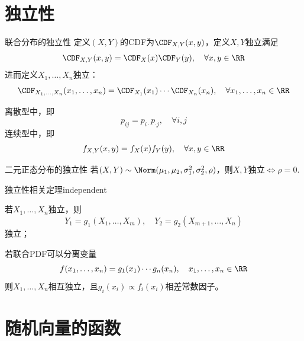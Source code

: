 \section{独立性}

\begin{definition}{联合分布的独立性}{}
	定义$(X,Y)$的CDF为$\CDF_{X,Y}(x,y)$，定义$X,Y$独立满足
	\begin{equation}
		\CDF_{X,Y}(x,y)=\CDF_X(x)\CDF_Y(y),\quad\forall x,y\in\RR
	\end{equation}
	进而定义$X_1,\ldots,X_n$独立： 
	\[
		\CDF_{X_1,\ldots,X_n}(x_1,\ldots,x_n)=\CDF_{X_1}(x_1)\cdots\CDF_{X_n}(x_n),\quad\forall x_1,\ldots,x_n\in\RR
	\]
\end{definition}
\begin{corollary}
	离散型中，即
	\[
		p_{ij}=p_{i\cdot}p_{\cdot j},\quad \forall i,j
	\]
	连续型中，即
	\[
		f_{X,Y}(x,y)=f_X(x)f_Y(y),\quad \forall x,y\in\RR
	\]
\end{corollary}
\begin{example}{二元正态分布的独立性}{}
	若$(X,Y)\sim\Norm(\mu_1,\mu_2,\sigma_1^2,\sigma_2^2,\rho)$，则$X,Y$独立$\iff\rho=0.$
\end{example}


\begin{theorem}{独立性相关定理}{independent}
	\begin{compactenum}
		\item 若$X_1,\ldots,X_n$独立，则
		\[
			Y_1=g_1(X_1,\ldots,X_m),\quad Y_2=g_2(X_{m+1},\ldots,X_n)
		\]
		独立；
		\item 若联合PDF可以分离变量
		\[
			f(x_1,\ldots,x_n)=g_1(x_1)\cdots g_n(x_n),\quad x_1,\ldots,x_n\in\RR
		\]
		则$X_1,\ldots,X_n$相互独立，且$g_i(x_i)\propto f_i(x_i)$相差常数因子。
	\end{compactenum}
\end{theorem}

\section{随机向量的函数}

